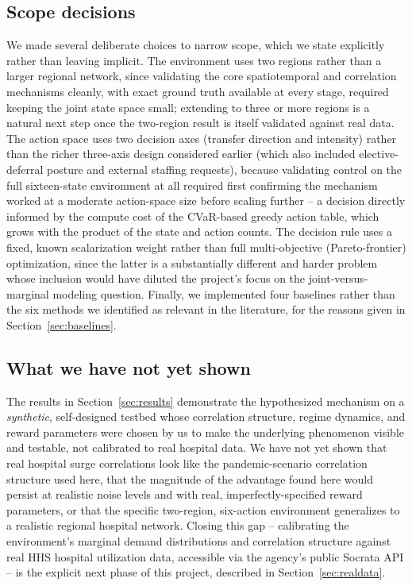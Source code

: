 \documentclass[11pt]{article}
\begin{document}
\subsection{Scope decisions}
\label{sec:scope}
We made several deliberate choices to narrow scope, which we state explicitly rather than leaving implicit. The environment uses two regions rather than a larger regional network, since validating the core spatiotemporal and correlation mechanisms cleanly, with exact ground truth available at every stage, required keeping the joint state space small; extending to three or more regions is a natural next step once the two-region result is itself validated against real data. The action space uses two decision axes (transfer direction and intensity) rather than the richer three-axis design considered earlier (which also included elective-deferral posture and external staffing requests), because validating control on the full sixteen-state environment at all required first confirming the mechanism worked at a moderate action-space size before scaling further -- a decision directly informed by the compute cost of the CVaR-based greedy action table, which grows with the product of the state and action counts. The decision rule uses a fixed, known scalarization weight rather than full multi-objective (Pareto-frontier) optimization, since the latter is a substantially different and harder problem whose inclusion would have diluted the project's focus on the joint-versus-marginal modeling question. Finally, we implemented four baselines rather than the six methods we identified as relevant in the literature, for the reasons given in Section~\ref{sec:baselines}.

\subsection{What we have not yet shown}
The results in Section~\ref{sec:results} demonstrate the hypothesized mechanism on a \emph{synthetic}, self-designed testbed whose correlation structure, regime dynamics, and reward parameters were chosen by us to make the underlying phenomenon visible and testable, not calibrated to real hospital data. We have not yet shown that real hospital surge correlations look like the pandemic-scenario correlation structure used here, that the magnitude of the advantage found here would persist at realistic noise levels and with real, imperfectly-specified reward parameters, or that the specific two-region, six-action environment generalizes to a realistic regional hospital network. Closing this gap -- calibrating the environment's marginal demand distributions and correlation structure against real HHS hospital utilization data, accessible via the agency's public Socrata API -- is the explicit next phase of this project, described in Section~\ref{sec:realdata}.
\end{document}
